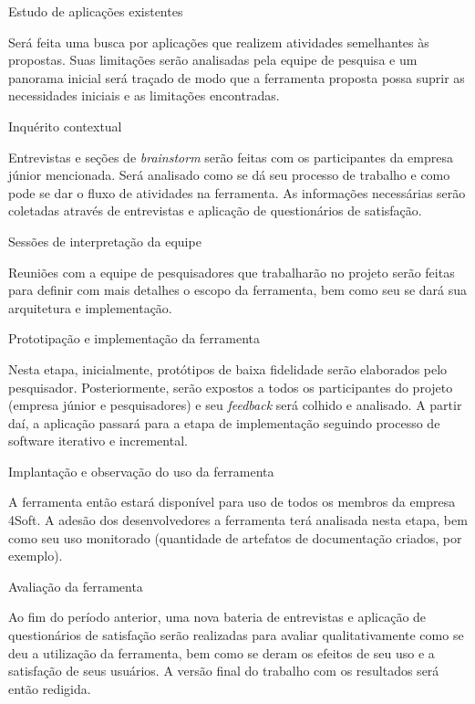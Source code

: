 \begin{description}
   \item Estudo de aplicações existentes

		Será feita uma busca por aplicações que realizem atividades semelhantes às propostas. Suas limitações serão analisadas pela equipe de pesquisa e um panorama inicial será traçado de modo que a ferramenta proposta possa suprir as necessidades iniciais e as limitações encontradas.
    
    \item Inquérito contextual

		Entrevistas e seções de \textit{brainstorm} serão feitas com os participantes da empresa júnior mencionada. Será analisado como se dá seu processo de trabalho e como pode se dar o fluxo de atividades na ferramenta. As informações necessárias serão coletadas através de entrevistas e aplicação de questionários de satisfação.

	\item Sessões de interpretação da equipe

		Reuniões com a equipe de pesquisadores que trabalharão no projeto serão feitas para definir com mais detalhes o escopo da ferramenta, bem como seu se dará sua arquitetura e implementação.

\item Prototipação e implementação da ferramenta

		Nesta etapa, inicialmente, protótipos de baixa fidelidade serão elaborados pelo pesquisador. Posteriormente, serão expostos a todos os participantes do projeto (empresa júnior e pesquisadores) e seu \textit{feedback} será colhido e analisado. A partir daí, a aplicação passará para a etapa de implementação seguindo processo de software iterativo e incremental.

\item Implantação e observação do uso da ferramenta

		A ferramenta então estará disponível para uso de todos os membros da empresa 4Soft. A adesão dos desenvolvedores a ferramenta terá analisada nesta etapa, bem como seu uso monitorado (quantidade de artefatos de documentação criados, por exemplo).
        
        
\item Avaliação da ferramenta

		Ao fim do período anterior, uma nova bateria de entrevistas e aplicação de questionários de satisfação serão realizadas para avaliar qualitativamente como se deu a utilização da ferramenta, bem como se deram os efeitos de seu uso e a satisfação de seus usuários. 
		A versão final do trabalho com os resultados será então redigida.


\end{description}
